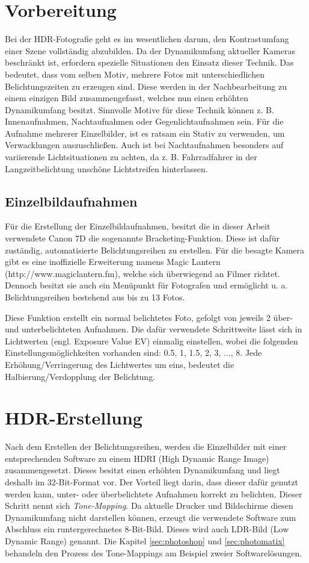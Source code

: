 \documentclass[liststotoc,bibtotoc,fontsize=14pt,]{scrreprt}
\begin{document}
	\chapter{Vorbereitung}
		Bei der HDR-Fotografie geht es im wesentlichen darum, den Kontrastumfang einer Szene vollständig abzubilden. Da der Dynamikumfang aktueller Kameras beschränkt ist, erfordern spezielle Situationen den Einsatz dieser Technik. Das bedeutet, dass vom selben Motiv, mehrere Fotos mit unterschiedlichen Belichtungszeiten zu erzeugen sind. Diese werden in der Nachbearbeitung zu einem einzigen Bild zusammengefasst, welches nun einen erhöhten Dynamikumfang besitzt. Sinnvolle Motive für diese Technik können z. B. Innenaufnahmen, Nachtaufnahmen oder Gegenlichtaufnahmen sein. Für die Aufnahme mehrerer Einzelbilder, ist es ratsam ein Stativ zu verwenden, um Verwacklungen auszuschließen. Auch ist bei Nachtaufnahmen besonders auf variierende Lichtsituationen zu achten, da z. B. Fahrradfahrer in der Langzeitbelichtung unschöne Lichtstreifen hinterlassen.
	
	\section{Einzelbildaufnahmen}
	\label{sec:einzel}
		Für die Erstellung der Einzelbildaufnahmen, besitzt die in dieser Arbeit verwendete Canon 7D die sogenannte Bracketing-Funktion. Diese ist dafür zuständig, automatisierte Belichtungsreihen zu erstellen. Für die besagte Kamera gibt es eine inoffizielle Erweiterung namens \grqq{}Magic Lantern\grqq{} (http://www.magiclantern.fm), welche sich überwiegend an Filmer richtet. Dennoch besitzt sie auch ein Menüpunkt für Fotografen und ermöglicht u. a. Belichtungsreihen bestehend aus bis zu 13 Fotos.
		
		\bigskip
		Diese Funktion erstellt ein normal belichtetes Foto, gefolgt von jeweils 2 über- und unterbelichteten Aufnahmen. Die dafür verwendete Schrittweite lässt sich in Lichtwerten (engl. Exposure Value EV) einmalig einstellen, wobei die folgenden Einstellungsmöglichkeiten vorhanden sind: 0.5, 1, 1.5, 2, 3, ..., 8. Jede Erhöhung/Verringerung des Lichtwertes um eins, bedeutet die Halbierung/Verdopplung der Belichtung. 

	\chapter{HDR-Erstellung}
	\label{ch:processing}
		Nach dem Erstellen der Belichtungsreihen, werden die Einzelbilder mit einer entsprechenden Software zu einem HDRI (High Dynamic Range Image) zusammengesetzt. Dieses besitzt einen erhöhten Dynamikumfang und liegt deshalb im 32-Bit-Format vor. Der Vorteil liegt darin, dass dieser dafür genutzt werden kann, unter- oder überbelichtete Aufnahmen korrekt zu belichten. Dieser Schritt nennt sich \textit{Tone-Mapping}.
		Da aktuelle Drucker und Bildschirme diesen Dynamikumfang nicht darstellen können, erzeugt die verwendete Software zum Abschluss ein runtergerechnetes 8-Bit-Bild. Dieses wird auch LDR-Bild (Low Dynamic Range) genannt. Die Kapitel \ref{sec:photoshop} und \ref{sec:photomatix} behandeln den Prozess des Tone-Mappings am Beispiel zweier Softwarelösungen.
\end{document}
